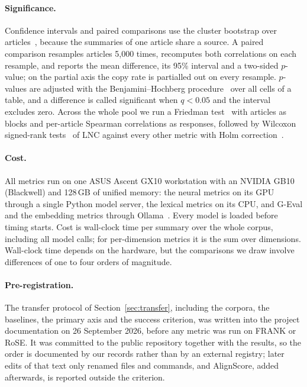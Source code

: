 \paragraph{Significance.} Confidence intervals and paired comparisons use the cluster bootstrap over articles~\citep{efron1993bootstrap,deutsch2021resampling}, because the summaries of one article share a source. A paired comparison resamples articles 5{,}000 times, recomputes both correlations on each resample, and reports the mean difference, its 95\% interval and a two-sided $p$-value; on the partial axis the copy rate is partialled out on every resample. $p$-values are adjusted with the Benjamini--Hochberg procedure~\citep{benjamini1995fdr} over all cells of a table, and a difference is called significant when $q<0.05$ and the interval excludes zero. Across the whole pool we run a Friedman test~\citep{friedman1937ranks,demsar2006statistical} with articles as blocks and per-article Spearman correlations as responses, followed by Wilcoxon signed-rank tests~\citep{wilcoxon1945individual} of LNC against every other metric with Holm correction~\citep{holm1979simple}.

\paragraph{Cost.} All metrics run on one ASUS Ascent GX10 workstation with an NVIDIA GB10 (Blackwell) and 128\,GB of unified memory: the neural metrics on its GPU through a single Python model server, the lexical metrics on its CPU, and G-Eval and the embedding metrics through Ollama~\citep{ollama2024}. Every model is loaded before timing starts. Cost is wall-clock time per summary over the whole corpus, including all model calls; for per-dimension metrics it is the sum over dimensions. Wall-clock time depends on the hardware, but the comparisons we draw involve differences of one to four orders of magnitude.

\paragraph{Pre-registration.} The transfer protocol of Section~\ref{sec:transfer}, including the corpora, the baselines, the primary axis and the success criterion, was written into the project documentation on 26 September 2026, before any metric was run on FRANK or RoSE. It was committed to the public repository together with the results, so the order is documented by our records rather than by an external registry; later edits of that text only renamed files and commands, and AlignScore, added afterwards, is reported outside the criterion.
